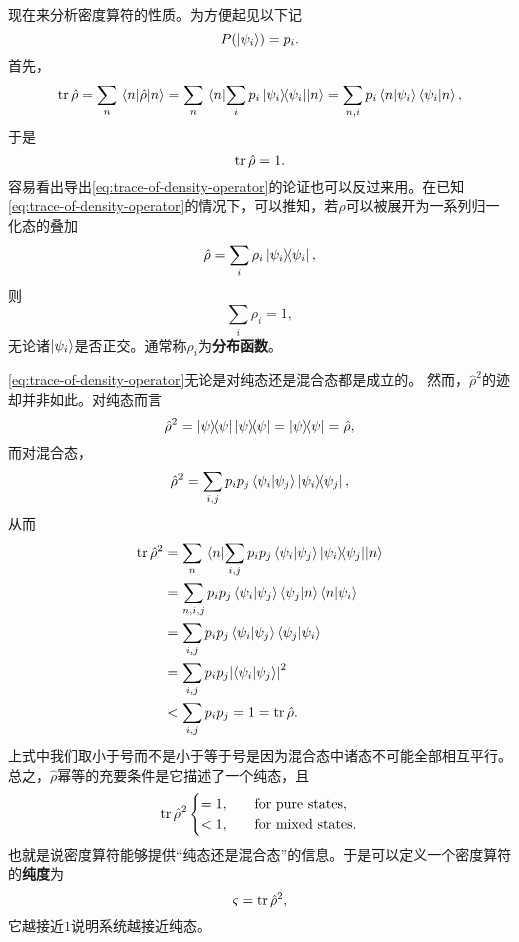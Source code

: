 \documentclass[hyperref, UTF8, a4paper]{ctexart}
\begin{document}
现在来分析密度算符的性质。为方便起见以下记
\[
    P(\ket{\psi_i}) = p_i.
\]
首先，
\[
    \trace \hat{\rho} = \sum_n \mel{n}{\hat{\rho}}{n} = \sum_n \mel{n}{\sum_i p_i \dyad{\psi_i}}{n} = \sum_{n, i} p_i \braket{n}{\psi_i} \braket{\psi_i}{n},
\]
于是
\begin{equation}
    \trace \hat{\rho} = 1.
    \label{eq:trace-of-density-operator}
\end{equation}
容易看出导出\eqref{eq:trace-of-density-operator}的论证也可以反过来用。在已知\eqref{eq:trace-of-density-operator}的情况下，可以推知，若$\hat{\rho}$可以被展开为一系列归一化态的叠加
\[
    \hat{\rho} = \sum_i \rho_i \dyad{\psi_i},
\]
则
\[
    \sum_i \rho_i = 1,
\]
无论诸$\ket{\psi_i}$是否正交。通常称$\rho_i$为\textbf{分布函数}。

\eqref{eq:trace-of-density-operator}无论是对纯态还是混合态都是成立的。
然而，$\hat{\rho}^2$的迹却并非如此。对纯态而言
\[
    \hat{\rho}^2 = \dyad{\psi} \dyad{\psi} = \dyad{\psi} = \hat{\rho},
\]
而对混合态，
\[
    \hat{\rho}^2 = \sum_{i, j} p_i p_j \braket{\psi_i}{\psi_j} \dyad{\psi_i}{\psi_j},
\]
从而
\[
    \begin{aligned}
        \trace \hat{\rho}^2 &= \sum_n \mel{n}{\sum_{i, j} p_i p_j \braket{\psi_i}{\psi_j} \dyad{\psi_i}{\psi_j}}{n} \\
        &= \sum_{n, i, j} p_i p_j \braket{\psi_i}{\psi_j} \braket{\psi_j}{n} \braket{n}{\psi_i} \\
        &= \sum_{i, j} p_i p_j \braket{\psi_i}{\psi_j} \braket{\psi_j}{\psi_i} \\
        &=  \sum_{i, j} p_i p_j \abs{\braket{\psi_i}{\psi_j}}^2 \\
        &< \sum_{i, j} p_i p_j = 1 = \trace \hat{\rho}.
    \end{aligned}
\]
上式中我们取小于号而不是小于等于号是因为混合态中诸态不可能全部相互平行。
总之，$\hat{\rho}$幂等的充要条件是它描述了一个纯态，且
\begin{equation}
    \trace \hat{\rho}^2 \begin{cases}
        = 1, \quad & \text{for pure states}, \\
        < 1, \quad & \text{for mixed states}.
    \end{cases}
    \label{eq:inequality-of-mixed-state}
\end{equation}
也就是说密度算符能够提供“纯态还是混合态”的信息。于是可以定义一个密度算符的\textbf{纯度}为
\begin{equation}
    \varsigma = \trace \hat{\rho}^2,
\end{equation}
它越接近$1$说明系统越接近纯态。
\end{document}
